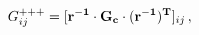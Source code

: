 \begin{equation}
  \label{modmetric}
     G^{+++}_{ij} = [{\bf r^{-1} \cdot G_c \cdot (r^{-1})^T}]_{ij}\, ,
\end{equation} 
